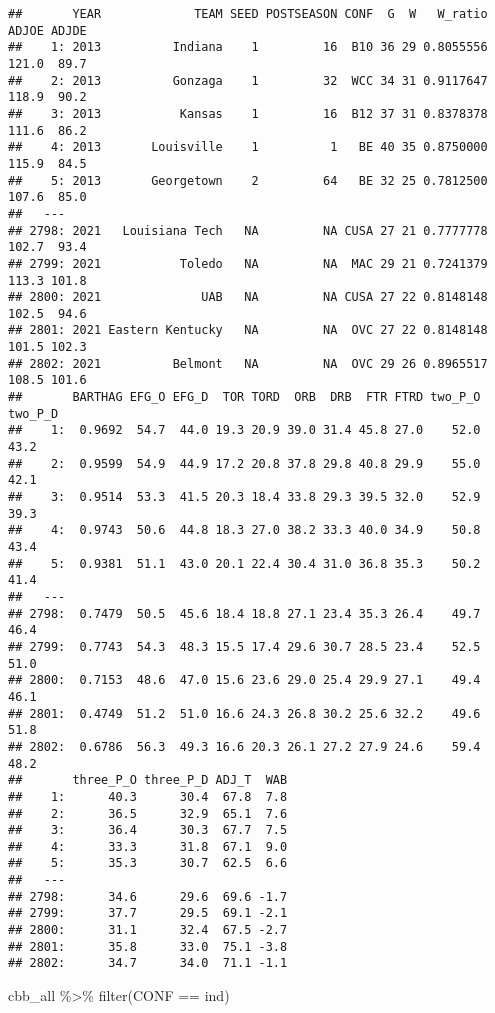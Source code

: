 \documentclass[
]{article}
\newenvironment{Shaded}{\begin{snugshade}}{\end{snugshade}}
\newcommand{\FunctionTok}[1]{\textcolor[rgb]{0.00,0.00,0.00}{#1}}
\newcommand{\NormalTok}[1]{#1}
\newcommand{\SpecialCharTok}[1]{\textcolor[rgb]{0.00,0.00,0.00}{#1}}
\newcommand{\StringTok}[1]{\textcolor[rgb]{0.31,0.60,0.02}{#1}}
\begin{document}
\begin{verbatim}
##       YEAR             TEAM SEED POSTSEASON CONF  G  W   W_ratio ADJOE ADJDE
##    1: 2013          Indiana    1         16  B10 36 29 0.8055556 121.0  89.7
##    2: 2013          Gonzaga    1         32  WCC 34 31 0.9117647 118.9  90.2
##    3: 2013           Kansas    1         16  B12 37 31 0.8378378 111.6  86.2
##    4: 2013       Louisville    1          1   BE 40 35 0.8750000 115.9  84.5
##    5: 2013       Georgetown    2         64   BE 32 25 0.7812500 107.6  85.0
##   ---                                                                       
## 2798: 2021   Louisiana Tech   NA         NA CUSA 27 21 0.7777778 102.7  93.4
## 2799: 2021           Toledo   NA         NA  MAC 29 21 0.7241379 113.3 101.8
## 2800: 2021              UAB   NA         NA CUSA 27 22 0.8148148 102.5  94.6
## 2801: 2021 Eastern Kentucky   NA         NA  OVC 27 22 0.8148148 101.5 102.3
## 2802: 2021          Belmont   NA         NA  OVC 29 26 0.8965517 108.5 101.6
##       BARTHAG EFG_O EFG_D  TOR TORD  ORB  DRB  FTR FTRD two_P_O two_P_D
##    1:  0.9692  54.7  44.0 19.3 20.9 39.0 31.4 45.8 27.0    52.0    43.2
##    2:  0.9599  54.9  44.9 17.2 20.8 37.8 29.8 40.8 29.9    55.0    42.1
##    3:  0.9514  53.3  41.5 20.3 18.4 33.8 29.3 39.5 32.0    52.9    39.3
##    4:  0.9743  50.6  44.8 18.3 27.0 38.2 33.3 40.0 34.9    50.8    43.4
##    5:  0.9381  51.1  43.0 20.1 22.4 30.4 31.0 36.8 35.3    50.2    41.4
##   ---                                                                  
## 2798:  0.7479  50.5  45.6 18.4 18.8 27.1 23.4 35.3 26.4    49.7    46.4
## 2799:  0.7743  54.3  48.3 15.5 17.4 29.6 30.7 28.5 23.4    52.5    51.0
## 2800:  0.7153  48.6  47.0 15.6 23.6 29.0 25.4 29.9 27.1    49.4    46.1
## 2801:  0.4749  51.2  51.0 16.6 24.3 26.8 30.2 25.6 32.2    49.6    51.8
## 2802:  0.6786  56.3  49.3 16.6 20.3 26.1 27.2 27.9 24.6    59.4    48.2
##       three_P_O three_P_D ADJ_T  WAB
##    1:      40.3      30.4  67.8  7.8
##    2:      36.5      32.9  65.1  7.6
##    3:      36.4      30.3  67.7  7.5
##    4:      33.3      31.8  67.1  9.0
##    5:      35.3      30.7  62.5  6.6
##   ---                               
## 2798:      34.6      29.6  69.6 -1.7
## 2799:      37.7      29.5  69.1 -2.1
## 2800:      31.1      32.4  67.5 -2.7
## 2801:      35.8      33.0  75.1 -3.8
## 2802:      34.7      34.0  71.1 -1.1
\end{verbatim}

\begin{Shaded}
\begin{Highlighting}[]
\NormalTok{cbb\_all }\SpecialCharTok{\%\textgreater{}\%} 
  \FunctionTok{filter}\NormalTok{(CONF }\SpecialCharTok{==} \StringTok{\textquotesingle{}ind\textquotesingle{}}\NormalTok{)}
\end{Highlighting}
\end{Shaded}
\end{document}
